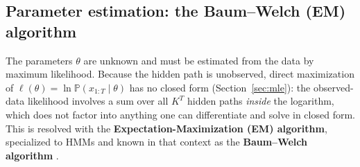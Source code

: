 \documentclass[11pt]{article}
\theoremstyle{definition}
\theoremstyle{remark}
\begin{document}
\subsection{Parameter estimation: the Baum--Welch (EM) algorithm}
\label{sec:baumwelch}

The parameters $\theta$ are unknown and must be estimated from the data by maximum likelihood. Because the hidden path is unobserved, direct maximization of $\ell(\theta)=\ln\mathbb{P}(x_{1:T}\mid\theta)$ has no closed form (Section~\ref{sec:mle}): the observed-data likelihood involves a sum over all $K^T$ hidden paths \emph{inside} the logarithm, which does not factor into anything one can differentiate and solve in closed form. This is resolved with the \textbf{Expectation-Maximization (EM) algorithm}, specialized to HMMs and known in that context as the \textbf{Baum--Welch algorithm} \cite{baum1970,rabiner1989}.
\end{document}
